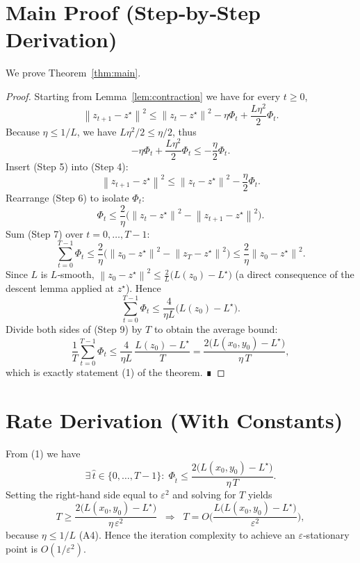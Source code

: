 \documentclass{article}
\newcommand{\norm}[1]{\left\|#1\right\|}
\begin{document}
\section*{Main Proof (Step‑by‑Step Derivation)}
We prove Theorem~\ref{thm:main}.

\begin{proof}
Starting from Lemma~\ref{lem:contraction} we have for every $t\ge0$,
\[
\norm{z_{t+1}-z^\star}^2
 \le \norm{z_t-z^\star}^2-\eta\Phi_t+\frac{L\eta^2}{2}\Phi_t.
\tag{Step 4}
\]
Because $\eta\le1/L$, we have $L\eta^2/2\le\eta/2$, thus
\[
-\eta\Phi_t+\frac{L\eta^2}{2}\Phi_t\le -\frac{\eta}{2}\Phi_t.
\tag{Step 5}
\]
Insert (Step 5) into (Step 4):
\[
\norm{z_{t+1}-z^\star}^2
 \le \norm{z_t-z^\star}^2-\frac{\eta}{2}\Phi_t .
\tag{Step 6}
\]
Rearrange (Step 6) to isolate $\Phi_t$:
\[
\Phi_t \le \frac{2}{\eta}\Big(\norm{z_t-z^\star}^2-\norm{z_{t+1}-z^\star}^2\Big).
\tag{Step 7}
\]
Sum (Step 7) over $t=0,\dots,T-1$:
\[
\sum_{t=0}^{T-1}\Phi_t
 \le \frac{2}{\eta}\Big(\norm{z_0-z^\star}^2-\norm{z_T-z^\star}^2\Big)
 \le \frac{2}{\eta}\norm{z_0-z^\star}^2 .
\tag{Step 8}
\]
Since $L$ is $L$‑smooth, $\norm{z_0-z^\star}^2\le \frac{2}{L}\big(L(z_0)-L^\star\big)$ (a direct consequence of the descent lemma applied at $z^\star$). Hence
\[
\sum_{t=0}^{T-1}\Phi_t
 \le \frac{4}{\eta L}\big(L(z_0)-L^\star\big).
\tag{Step 9}
\]
Divide both sides of (Step 9) by $T$ to obtain the average bound:
\[
\frac{1}{T}\sum_{t=0}^{T-1}\Phi_t
 \le \frac{4}{\eta L}\,\frac{L(z_0)-L^\star}{T}
 =\frac{2\big(L(x_0,y_0)-L^\star\big)}{\eta\,T},
\]
which is exactly statement (1) of the theorem. ∎
\end{proof}

\section*{Rate Derivation (With Constants)}
From (1) we have
\[
\exists\,\hat t\in\{0,\dots,T-1\}:\;
\Phi_{\hat t}\le\frac{2\big(L(x_0,y_0)-L^\star\big)}{\eta\,T}.
\]
Setting the right‑hand side equal to $\varepsilon^2$ and solving for $T$ yields
\[
T\ge \frac{2\big(L(x_0,y_0)-L^\star\big)}{\eta\,\varepsilon^2}
\;\;\Longrightarrow\;\;
T=O\!\Big(\frac{L\big(L(x_0,y_0)-L^\star\big)}{\varepsilon^2}\Big),
\]
because $\eta\le1/L$ (A4).  Hence the iteration complexity to achieve an $\varepsilon$‑stationary point is $O(1/\varepsilon^2)$.
\end{document}
